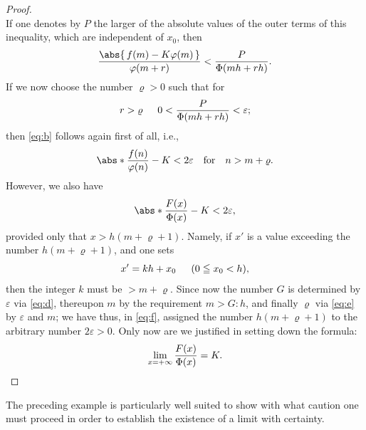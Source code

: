 \documentclass[a4paper]{amsbook}
\begin{document}
\begin{proof}
\begin{equation*}
  \end{equation*}
  If one denotes by \(P\) the larger of the absolute values of the outer terms of this inequality, which are independent of \(x_0\), then
  \begin{equation*}
    \frac{\abs{\,f(m) - K\varphi(m)\,}}{\varphi(m+r)} < \frac{P}{\Phi(mh+rh)}.
  \end{equation*}
  If we now choose the number \(\varrho > 0\) such that for
  \begin{equation}
    \label{eq:e}
    r > \varrho
    \hspace{1.5em}
    0 < \frac{P}{\Phi(mh+rh)} < \varepsilon;
  \end{equation}
  then \eqref{eq:b} follows again first of all, i.e.,
  \begin{equation*}
    \abs*{\frac{f(n)}{\varphi (n)}-K} < 2\varepsilon
    \qfor
    n > m + \varrho.
  \end{equation*}
  However, we also have
  \begin{equation}
    \label{eq:f}
    \abs*{\frac{F(x)}{\Phi(x)} - K} < 2\varepsilon,
  \end{equation}
  provided only that \(x > h(m + \varrho + 1)\).  Namely, if \(x'\) is a value exceeding the number \(h(m + \varrho + 1)\), and one sets
  \begin{equation*}
    x' = kh + x_0
    \hspace{1.5em}
    (0 \leqq x_0 < h),
  \end{equation*}
  then the integer \(k\) must be \(> m+\varrho\).  Since now the number \(G\) is determined by \(\varepsilon \) via \eqref{eq:d}, thereupon \(m\) by the requirement \(m > G : h\), and finally \(\varrho \) via \eqref{eq:e} by \(\varepsilon \) and \(m\); we have thus, in \eqref{eq:f}, assigned the number \(h(m + \varrho + 1)\) to the arbitrary number \(2\varepsilon > 0\).  Only now are we justified in setting down the formula:
  \begin{equation*}
    \lim_{x=+\infty} \frac{F(x)}{\Phi(x)} = K.
    \qedhere
  \end{equation*}
\end{proof}

The preceding example is particularly well suited to show with what caution one must proceed in order to establish the existence of a limit with certainty.
\end{document}
